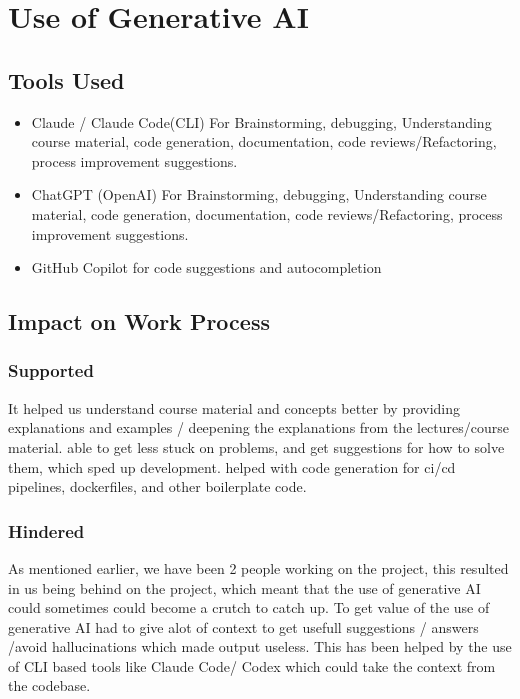 \section{Use of Generative AI}



\subsection{Tools Used}
\begin{itemize}                                                                                                                            
    \item Claude / Claude Code(CLI) For Brainstorming, debugging, Understanding course material, code generation, documentation, code reviews/Refactoring, process improvement suggestions.        
    \item ChatGPT (OpenAI) For Brainstorming, debugging, Understanding course material, code generation, documentation, code reviews/Refactoring, process improvement suggestions.
    \item GitHub Copilot for code suggestions and autocompletion                                                               
\end{itemize} 

\subsection{Impact on Work Process}

\subsubsection{Supported}
It helped us understand course material and concepts better by providing explanations and examples / deepening the explanations from the lectures/course material.
able to get less stuck on problems, and get suggestions for how to solve them, which sped up development. 
helped  with code generation for ci/cd pipelines, dockerfiles, and other boilerplate code. 

\subsubsection{Hindered}
As mentioned earlier, we have been 2 people working on the project, this resulted in us being behind on the project, which meant that the use of generative AI could sometimes could become a crutch to catch up.
\noindent To get value of the use of generative AI had to give alot of context to get usefull suggestions / answers /avoid hallucinations which made output useless. This has been helped by the use of CLI based tools like Claude Code/ Codex which could take the context from the codebase.

